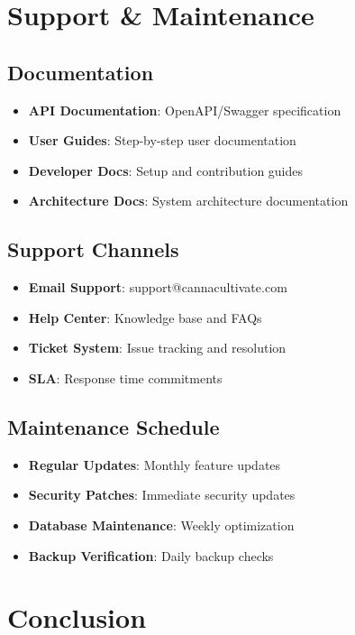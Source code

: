\documentclass[11pt,a4paper]{article}
\begin{document}
\section{Support \& Maintenance}

\subsection{Documentation}
\begin{itemize}
    \item \textbf{API Documentation}: OpenAPI/Swagger specification
    \item \textbf{User Guides}: Step-by-step user documentation
    \item \textbf{Developer Docs}: Setup and contribution guides
    \item \textbf{Architecture Docs}: System architecture documentation
\end{itemize}

\subsection{Support Channels}
\begin{itemize}
    \item \textbf{Email Support}: support@cannacultivate.com
    \item \textbf{Help Center}: Knowledge base and FAQs
    \item \textbf{Ticket System}: Issue tracking and resolution
    \item \textbf{SLA}: Response time commitments
\end{itemize}

\subsection{Maintenance Schedule}
\begin{itemize}
    \item \textbf{Regular Updates}: Monthly feature updates
    \item \textbf{Security Patches}: Immediate security updates
    \item \textbf{Database Maintenance}: Weekly optimization
    \item \textbf{Backup Verification}: Daily backup checks
\end{itemize}

\section{Conclusion}
\end{document}
